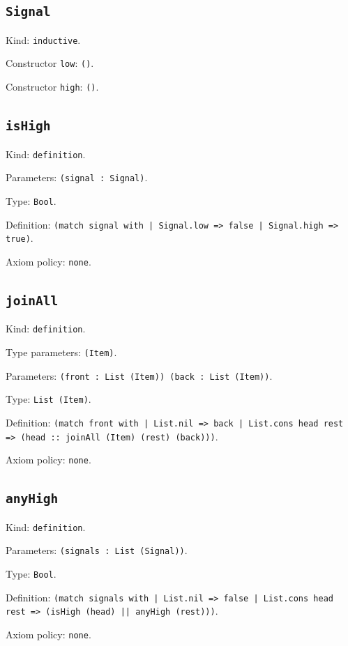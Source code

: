 \documentclass[11pt]{article}
\begin{document}
\subsection*{\texttt{Signal}}
\noindent Kind: \texttt{inductive}.\par
\noindent Constructor \texttt{low}: \texttt{()}.\par
\noindent Constructor \texttt{high}: \texttt{()}.\par
\subsection*{\texttt{isHigh}}
\noindent Kind: \texttt{definition}.\par
\noindent Parameters: \texttt{(signal : Signal)}.\par
\noindent Type: \texttt{Bool}.\par
\noindent Definition: \texttt{(match signal with | Signal.low => false | Signal.high => true)}.\par
\noindent Axiom policy: \texttt{none}.\par
\subsection*{\texttt{joinAll}}
\noindent Kind: \texttt{definition}.\par
\noindent Type parameters: \texttt{(Item)}.\par
\noindent Parameters: \texttt{(front : List (Item)) (back : List (Item))}.\par
\noindent Type: \texttt{List (Item)}.\par
\noindent Definition: \texttt{(match front with | List.nil => back | List.cons head rest => (head :: joinAll (Item) (rest) (back)))}.\par
\noindent Axiom policy: \texttt{none}.\par
\subsection*{\texttt{anyHigh}}
\noindent Kind: \texttt{definition}.\par
\noindent Parameters: \texttt{(signals : List (Signal))}.\par
\noindent Type: \texttt{Bool}.\par
\noindent Definition: \texttt{(match signals with | List.nil => false | List.cons head rest => (isHigh (head) || anyHigh (rest)))}.\par
\noindent Axiom policy: \texttt{none}.\par
\end{document}
